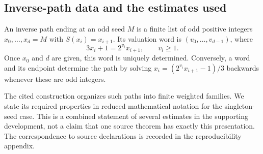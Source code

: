 \subsection{Inverse-path data and the estimates used}
An inverse path ending at an odd seed $M$ is a finite list of odd positive
integers $x_0,\ldots,x_d=M$ with $S(x_i)=x_{i+1}$.
Its valuation word is $(v_0,\ldots,v_{d-1})$, where
\[
 3x_i+1=2^{v_i}x_{i+1},\qquad v_i\ge1.
\]
Once $x_0$ and $d$ are given, this word is uniquely determined.
Conversely, a word and its endpoint determine the path by solving
$x_i=(2^{v_i}x_{i+1}-1)/3$ backwards whenever these are odd integers.

The cited construction organizes such paths into finite weighted families.
We state its required properties in reduced mathematical notation for
the singleton-seed case. This is a combined statement of several estimates
in the supporting development, not a claim that one source theorem has
exactly this presentation. The correspondence to source declarations is
recorded in the reproducibility appendix.

